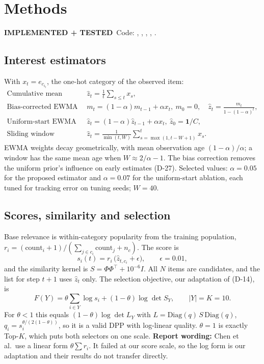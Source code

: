 \documentclass[11pt,a4paper]{article}
\newcommand{\statustag}[2]{\colorbox{#1}{\scriptsize\sffamily\bfseries #2}}
\newcommand{\implemented}{\statustag{blue!12}{IMPLEMENTED + TESTED}}
\newcommand{\zhat}{\hat{z}}
\begin{document}
\section{Methods}\label{sec:methods}
\implemented\ Code: , , ,
, .

\subsection{Interest estimators}
With $x_t=e_{c_{i_t}}$, the one-hot category of the observed item:
\begin{align}
\text{Cumulative mean (static):}\quad & \zhat_t=\tfrac1t\textstyle\sum_{s\le t}x_s,\\
\text{Bias-corrected EWMA (adaptive):}\quad & m_t=(1-\alpha)m_{t-1}+\alpha x_t,\ m_0=0,\quad \zhat_t=\frac{m_t}{1-(1-\alpha)^t},\\
\text{Uniform-start EWMA (ablation):}\quad & \zhat_t=(1-\alpha)\zhat_{t-1}+\alpha x_t,\ \zhat_0=\mathbf 1/C,\\
\text{Sliding window (ablation):}\quad & \zhat_t=\tfrac{1}{\min(t,W)}\textstyle\sum_{s=\max(1,t-W+1)}^{t}x_s.
\end{align}
EWMA weights decay geometrically, with mean observation age $(1-\alpha)/\alpha$; a window has
the same mean age when $W\approx 2/\alpha-1$. The bias correction removes the uniform prior's
influence on early estimates (D-27). Selected values: $\alpha=0.05$ for the proposed estimator
and $\alpha=0.07$ for the uniform-start ablation, each tuned for tracking error on tuning
seeds; $W=40$.

\subsection{Scores, similarity and selection}
Base relevance is within-category popularity from the training population,
$r_i=(\mathrm{count}_i+1)/(\sum_{j\in c_i}\mathrm{count}_j+n_c)$. The score is
\begin{equation}
s_i(t)=r_i\,\big(\zhat_{t,c_i}+\epsilon\big),\qquad \epsilon=0.01,
\end{equation}
and the similarity kernel is $S=\Phi\Phi^\top+10^{-6}I$. All $N$ items are candidates, and the
list for step $t+1$ uses $\zhat_t$ only. The selection objective, our adaptation of
\citet{chen2018fast} (D-14), is
\begin{equation}
F(Y)=\theta\sum_{i\in Y}\log s_i+(1-\theta)\log\det S_Y,\qquad |Y|=K=10.
\end{equation}
For $\theta<1$ this equals $(1-\theta)\log\det L_Y$ with
$L=\mathrm{Diag}(q)\,S\,\mathrm{Diag}(q)$, $q_i=s_i^{\theta/(2(1-\theta))}$, so it is a valid DPP
with log-linear quality. $\theta=1$ is exactly Top-$K$, which puts both selectors on one
scale. \textbf{Report wording:} Chen et al.\ use a linear form $\theta\sum r_i$. It failed at
our score scale, so the log form is our adaptation and their results do not transfer
directly.
\end{document}
